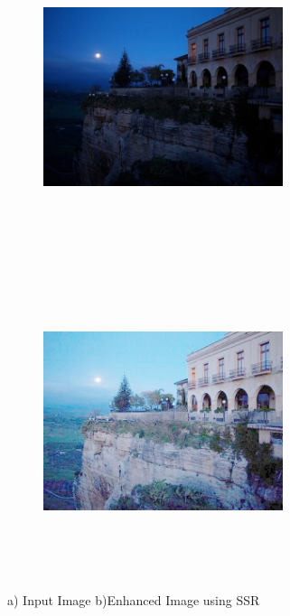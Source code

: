\begin{figure}[!htb]
	\begin{subfigure}{8cm}
		\centering    
    	\includegraphics[width=7cm,height=9cm,keepaspectratio]{images/ch5/palace_input.jpg}
    	\caption{} 
    \end{subfigure}
  	\begin{subfigure}{6cm}
  		\centering
  		\includegraphics[width=7cm,height=9cm,keepaspectratio]{images/ch5/palace_ssr.jpg}
   		\caption{}
  	\end{subfigure}
  	\caption{a) Input Image b)Enhanced Image using SSR}
  	\label{fig:ssrPalace}
\end{figure}



